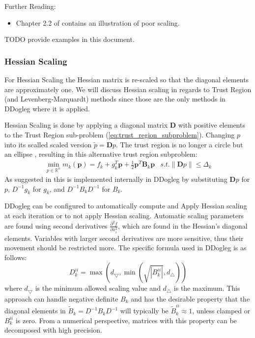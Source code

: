\documentclass[peerreview,compsoc,onecolumn]{IEEEtran}
\newcommand{\R}{\mathbb{R}}
\newcommand{\norm}[1]{\left\lVert#1\right\rVert}
\begin{document}
Further Reading:
\begin{itemize}
\item Chapter 2.2 of \cite{numopt2006} contains an illustration of poor scaling.
\end{itemize}

TODO provide examples in this document.

\subsubsection{Hessian Scaling}

For Hessian Scaling the Hessian matrix is re-scaled so that the diagonal elements are approximately one. We will discuss Hessian scaling in regards to Trust Region (and Levenberg-Marquardt) methods since those are the only methods in DDogleg where it is applied.

Hessian Scaling is done by applying a diagonal matrix $\bm{D}$ with positive elements to the Trust Region sub-problem (\ref{eq:trust_region_subproblem}). Changing $p$ into its scalled scaled version $\tilde{p} = \bm{D}p$. The trust region is no longer a circle but an ellipse \cite{numopt2006}, resulting in this alternative trust region subproblem:
\begin{equation}
\begin{array}{lr}
\min\limits_{p\in \R^n} m_k(\bm{p}) = f_k + g^T_k \bm{p} + \frac{1}{2}\bm{p}^T \bm{B}_k \bm{p} & s.t. \norm{\bm{D}p} \le \Delta_k
\end{array}
\end{equation}
As suggested in \cite{numopt2006} this is implemented internally in DDogleg by substituting $\bm{D}p$ for $p$, $D^{-1}g_k$ for $g_k$, and $D^{-1}B_k D^{-1}$ for $B_k$.  

DDogleg can be configured to automatically compute and Apply Hessian scaling at each iteration or to not apply Hessian scaling. Automatic scaling parameters are found using second derivatives $\frac{\partial^2 f}{\partial x^2_i}$, which are found in the Hessian's diagonal elements. Variables with larger second derivatives are more sensitive, thus their movement should be restricted more. The specific formula used in DDogleg is as follows:
\begin{equation}
D_k^{ii} = \max\left( d_{\bigtriangledown},\min\left( \sqrt{|B_k^{ii}|} , d_{\bigtriangleup} \right)\right)
\end{equation}
where $d_{\bigtriangledown}$ is the minimum allowed scaling value and $d_{\bigtriangleup}$ is the maximum. This approach can handle negative definite $B_k$ and has the desirable property \cite{dennis1996} that the diagonal elements in $\tilde{B}_k = D^{-1}B_k D^{-1}$ will typically be $\tilde{B}_k^{ii} \approx 1$, unless clamped or $B_k^{ii}$ is zero. From a numerical perspective, matrices with this property can be decomposed with high precision. 
\end{document}
